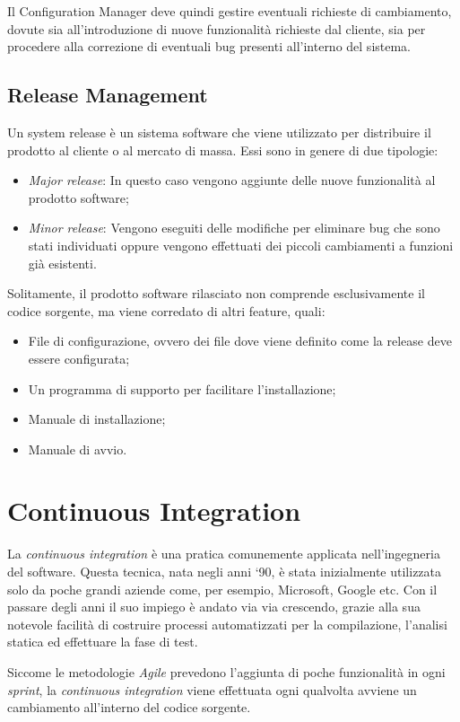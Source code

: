 Il Configuration Manager deve quindi gestire eventuali richieste di
cambiamento, dovute sia all’introduzione di nuove funzionalità richieste dal
cliente, sia per procedere alla correzione di eventuali bug presenti all’interno del
sistema. 

\subsection{Release Management}
Un system release è un sistema software che viene utilizzato per distribuire il
prodotto al cliente o al mercato di massa. Essi sono in genere di due tipologie:
\begin{itemize}
	\item \emph{Major release}: In questo caso vengono aggiunte delle nuove funzionalità al prodotto software;
	\item \emph{Minor release}: Vengono eseguiti delle modifiche per eliminare bug che sono stati individuati oppure vengono effettuati dei piccoli cambiamenti a
	funzioni già esistenti.
\end{itemize}

Solitamente, il prodotto software rilasciato non comprende esclusivamente il
codice sorgente, ma viene corredato di altri feature, quali:
\begin{itemize}
	\item File di configurazione, ovvero dei file dove viene definito come la release
	deve essere configurata;
	\item Un programma di supporto per facilitare l’installazione;
	\item Manuale di installazione;
	\item Manuale di avvio.
\end{itemize}
\section{Continuous Integration}
La \emph{continuous integration} è una pratica comunemente applicata
nell’ingegneria del software. Questa tecnica, nata negli anni ‘90, è stata inizialmente utilizzata solo da poche grandi aziende come, per esempio, Microsoft, Google etc. Con il passare degli anni il suo impiego è andato via via crescendo, grazie alla sua notevole facilità di costruire processi automatizzati per la compilazione, l’analisi statica ed effettuare la fase di test.

Siccome le metodologie \emph{Agile} prevedono l’aggiunta di poche funzionalità in ogni \emph{sprint}, la \emph{continuous integration} viene effettuata ogni qualvolta avviene un cambiamento all’interno del codice sorgente.

